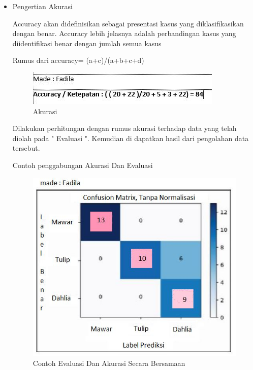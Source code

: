 \begin{enumerate}
\begin{itemize}
\par
\item Pengertian Akurasi
\par Accuracy akan didefinisikan sebagai presentasi kasus yang diklasifikasikan dengan benar. Accuracy lebih jelasnya adalah perbandingan kasus yang diidentifikasi benar dengan jumlah semua kasus
\par Rumus dari accuracy= (a+c)/(a+b+c+d)
\par

\begin{figure}[ht]
\centering
\includegraphics[scale=0.8]{figures/acuracy.jpg}
\caption{Akurasi}
\label{contoh}
\end{figure}

\par Dilakukan perhitungan dengan rumus akurasi terhadap data yang telah diolah pada " Evaluasi ". Kemudian di dapatkan hasil dari pengolahan data tersebut.
\par Contoh penggabungan Akurasi Dan Evaluasi
\par

\begin{figure}[ht]
\centering
\includegraphics[scale=0.5]{figures/evacuray.jpg}
\caption{Contoh Evaluasi Dan Akurasi Secara Bersamaan }
\label{contoh}
\end{figure}


\end{itemize}
\end{enumerate}

